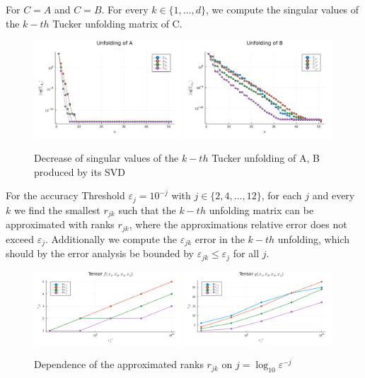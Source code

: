 \documentclass[a4paper]{article}
\newcommand{\eps}{\varepsilon}
\begin{document}
For $C = A$ and $C =B$.
For every $k \in \{1, \dots , d\}$, we compute the singular values of the $k-th$
Tucker unfolding matrix of C.
\begin{figure}[H]
    \centering
    \includegraphics[width=0.49\textwidth]{./plots/singular-dec-A.png}
    \includegraphics[width=0.49\textwidth]{./plots/singular-dec-B.png}
    \caption{Decrease of singular values of the $k-th$ Tucker unfolding of A,
    B produced by its SVD}
\end{figure}

For the accuracy Threshold $\eps_j = 10^{-j}$ with $j \in \{2, 4, \dots,
12\}$, for each $j$ and every $k$ we find the smallest $r_{jk}$ such that the
$k-th$ unfolding matrix can be approximated with ranks $r_{jk}$, where the
approximations relative error does not exceed $\eps_j$. Additionally we
compute the $\eps_{jk}$ error in the $k-th$ unfolding, which
should by the error analysis be bounded by $\eps_{jk} \leq \eps_{j}$ for all
$j$.
\begin{figure}[H]
    \centering
    \includegraphics[width=0.49\textwidth]{./plots/hosvd-error-A.png}
    \includegraphics[width=0.49\textwidth]{./plots/hosvd-error-B.png}
    \caption{Dependence of the approximated ranks $r_{jk}$ on $j =
    \log_{10}\eps^{-j}$}
\end{figure}
\end{document}
